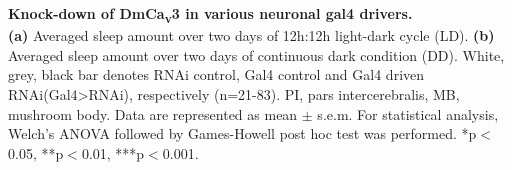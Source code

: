 \label{fig:S4}
\textbf{Knock-down of DmCa\textsubscript{v}3 in various neuronal gal4 drivers.}
\\
\textbf {(a)} Averaged sleep amount over two days of 12h:12h light-dark cycle (LD).
\textbf {(b)} Averaged sleep amount over two days of continuous dark condition (DD).
White, grey, black bar denotes RNAi control, Gal4 control and Gal4 driven RNAi(Gal4\textgreater{}RNAi), respectively (n=21-83).
PI, pars intercerebralis, MB, mushroom body. 
Data are represented as mean $\pm$ s.e.m.
For statistical analysis, Welch's ANOVA followed by Games-Howell post hoc test was performed.
*p$<$0.05, **p$<$0.01, ***p$<$0.001.
  
  
  
  